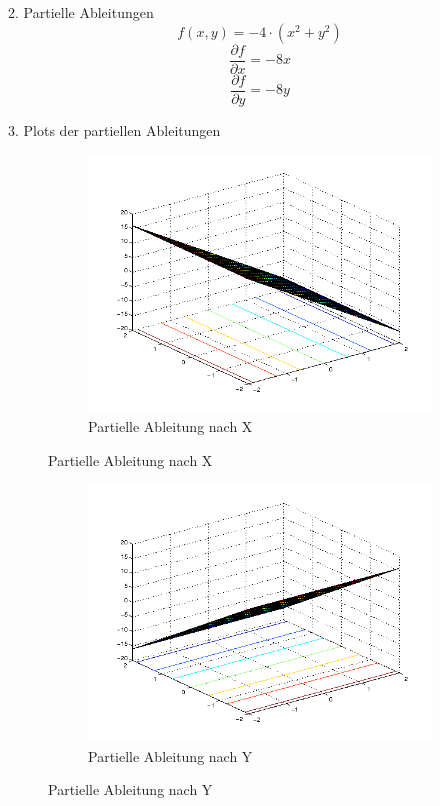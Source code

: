 \documentclass{article}
\begin{document}
	 	2. Partielle Ableitungen
	 	\[
	 		f(x,y) = -4 \cdot (x^2 + y^2)
	 	\]
	 	\[
	 		\dfrac{\partial f}{\partial x} = -8x
	 	\]
	 	\[
	 		\dfrac{\partial f}{\partial y} = -8y
	 	\]
	 	
	 	3. Plots der partiellen Ableitungen
		\begin{figure}[H]
		  \begin{subfigure}
		    \centering
		    \includegraphics[scale=0.5,bb=0 0 576 432]{task3-f1-derivatedX.png}
			\caption{Partielle Ableitung nach X}
		  \end{subfigure}
		\end{figure}
		\begin{figure}[H]
		  \begin{subfigure}
		    \centering
		    \includegraphics[scale=0.5,bb=0 0 576 432]{task3-f1-derivatedY.png}
			\caption{Partielle Ableitung nach Y}
		  \end{subfigure}
		\end{figure}
		
\end{document}
